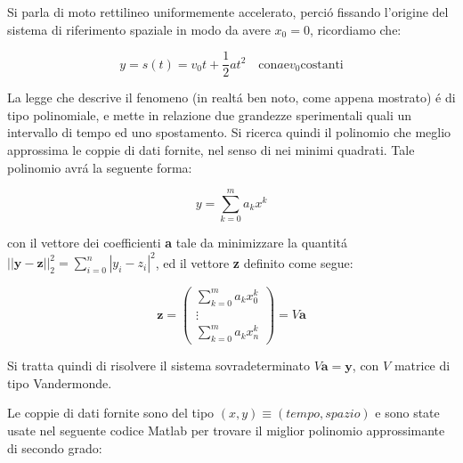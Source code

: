 \begin{center}
\footnotesize\noindent{}\end{center}

\noindent Si parla di moto rettilineo uniformemente accelerato, perci\'o fissando l'origine del sistema di riferimento spaziale in modo da avere \(x_0 = 0\), ricordiamo che:

\[
  y =  s(t) = v_0t +  \frac{1}{2}at^2 \quad \text{con} a \text{e} v_0 \text{costanti}
\]

\noindent La legge che descrive il fenomeno (in realt\'a ben noto, come appena mostrato) \'e di tipo polinomiale, e mette in relazione due grandezze sperimentali quali un intervallo di tempo ed uno spostamento. Si ricerca quindi il polinomio che meglio approssima le coppie di dati fornite, nel senso di nei minimi quadrati. Tale polinomio avr\'a la seguente forma:

\[
  y = \sum^m_{k=0}a_kx^k
\]

\noindent con il vettore dei coefficienti \textbf{a} tale da minimizzare la quantit\'a \(||\textbf{y}-\textbf{z}||^2_2 = \sum^n_{i=0}|y_i-z_i|^2\), ed il vettore \textbf{z} definito come segue:

\[
  \textbf{z} = \begin{pmatrix} \sum_{k=0}^m a_kx_0^k \\ \vdots \\  \sum_{k=0}^m a_kx_n^k \end{pmatrix} = V \textbf{a}
\]

\noindent Si tratta quindi di risolvere il sistema sovradeterminato \(V \textbf{a} = \textbf{y} \), con \(V\) matrice di tipo Vandermonde.

\noindent Le coppie di dati fornite sono del tipo \((x, y) \equiv  (tempo, spazio)\) e sono state usate nel seguente codice Matlab per trovare il miglior polinomio approssimante di secondo grado:


